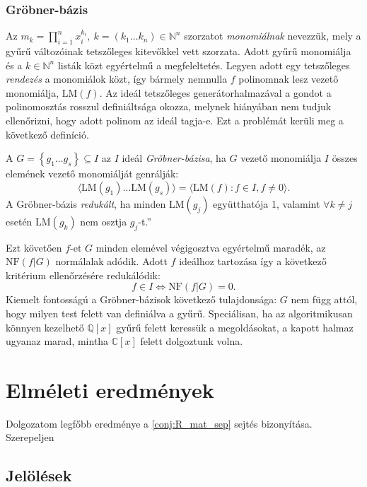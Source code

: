 \documentclass[12pt,a4paper,oneside]{report}
\newcommand{\C}{\mathbb{C}}
\newcommand{\N}{\mathbb{N}}
\newcommand{\Qring}{\mathbb{Q}[x]}
\newcommand{\LM}{\mathrm{LM}}
\newcommand{\NF}{\mathrm{NF}}
\begin{document}
\subsection{Gröbner-bázis}
Az $m_k=\prod_{i=1}^n x_i^{k_i},\ k=(k_1\dots k_n)\in \N^n$ szorzatot \textit{monomiálnak} nevezzük, mely a gyűrű változóinak tetszőleges kitevőkkel vett szorzata. Adott gyűrű monomiálja és a $k\in\N^n$ listák közt egyértelmű a megfeleltetés. Legyen adott egy tetszőleges \textit{rendezés} a monomiálok közt, így bármely nemnulla $f$ polinomnak lesz vezető monomiálja, $\LM(f)$. Az ideál tetszőleges generátorhalmazával a gondot a polinomosztás rosszul definiáltsága okozza, melynek hiányában nem tudjuk ellenőrizni, hogy adott polinom az ideál tagja-e. Ezt a problémát kerüli meg a következő definíció.
\begin{definicio}
    A $G=\left\{g_1\dots g_s\right\}\subseteq I$ az $I$ ideál \textit{Gröbner-bázisa}, ha $G$ vezető monomiálja $I$ összes elemének vezető monomiálját genrálják:
    \begin{equation}\label{eq:Gröbner}
        \langle\LM(g_1)\dots\LM(g_s) \rangle=\langle\LM(f):f\in I, f\neq0 \rangle.
    \end{equation}
    A Gröbner-bázis \textit{redukált}, ha minden $\LM(g_j)$ együtthatója 1, valamint $\forall k\neq j$ esetén $\LM(g_k)$ nem osztja $g_j$-t.”
\end{definicio}
Ezt követően $f$-et $G$ minden elemével végigosztva egyértelmű maradék, az $\NF(f|G)$ normálalak adódik. Adott $f$ ideálhoz tartozása így a következő kritérium ellenőrzésére redukálódik:
\begin{equation}\label{eq:ideal_membership}
    f\in I \iff \NF(f|G) =0.
\end{equation}
Kiemelt fontosságú a Gröbner-bázisok következő tulajdonsága: $G$ nem függ attól, hogy milyen test felett van definiálva a gyűrű. Speciálisan, ha az algoritmikusan könnyen kezelhető $\Qring$ gyűrű felett keressük a megoldásokat, a kapott halmaz ugyanaz marad, mintha $\C[x]$ felett dolgoztunk volna.

\chapter{Elméleti eredmények}
Dolgozatom legfőbb eredménye a \ref{conj:R_mat_sep} sejtés bizonyítása. Szerepeljen 


\section{Jelölések}
\end{document}
